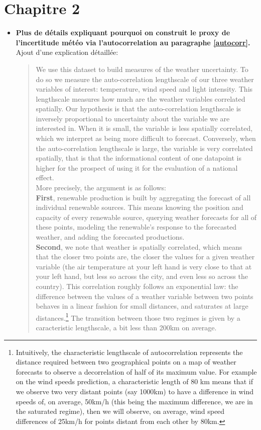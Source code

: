\documentclass{article}
\begin{document}
\section{Chapitre 2}
\begin{itemize}
\item \textbf{Plus de détails expliquant pourquoi on construit le proxy de l'incertitude météo via l'autocorrelation au paragraphe \ref{autocorr}.}\\

Ajout d'une explication détaillée:

\begin{quote}
We use this dataset to build measures of the weather uncertainty. To do so we measure the auto-correlation lengthscale of our three weather variables of interest: temperature, wind speed and light intensity. This lengthscale measures how much are the weather variables correlated spatially. Our hypothesis is that the auto-correlation lengthscale is inversely proportional to uncertainty about the variable we are interested in. When it is small, the variable is less spatially correlated, which we interpret as being more difficult to forecast. Conversely, when the auto-correlation lengthscale is large, the variable is very correlated spatially, that is that the informational content of one datapoint is higher for the prospect of using it for the evaluation of a national effect.\\

More precisely, the argument is as follows: \\

\textbf{First}, renewable production is built by aggregating the forecast of all individual renewable sources. This means knowing the position and capacity of every renewable source, querying weather forecasts for all of these points, modeling the renewable's response to the forecasted weather, and adding the forecasted productions. \\

\textbf{Second}, we note that weather is spatially correlated, which means that the closer two points are, the closer the values for a given weather variable (the air temperature at your left hand is very close to that at your left hand, but less so across the city, and even less so across the country). This correlation roughly follows an exponential law: the difference between the values of a weather variable between two points behaves in a linear fashion for small distances, and saturates at large distances.\footnote{Intuitively, the characteristic lengthscale of autocorrelation represents the distance required between two geographical points on a map of weather forecasts to observe a decorrelation of half of its maximum value. For example on the wind speeds prediction, a characteristic length of 80 km means that if we observe two very distant points (say 1000km) to have a difference in wind speeds of, on average, 50km/h (this being the maximum difference, we are in the saturated regime), then we will observe, on average, wind speed differences of 25km/h for points distant from each other by 80km.} The transition between those two regimes is given by a caracteristic lengthscale, a bit less than 200km on average. \\


\end{quote}
\end{itemize}
\end{document}
